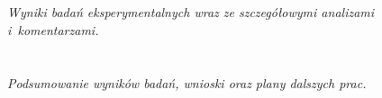 \documentclass[polish]{projectreport}
\begin{document}
\section{\SectionTitleExperiments}
\label{sec:experiments}

\emph{Wyniki bada\'n eksperymentalnych wraz ze szczeg\'o\l{}owymi analizami i~komentarzami.}

\section{\SectionTitleSummary}
\label{sec:conclusions}

\emph{Podsumowanie wynik\'ow bada\'n, wnioski oraz plany dalszych prac.}

\printbibliography
\end{document}
